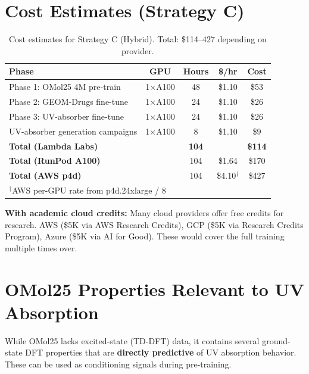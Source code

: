 \documentclass[11pt,a4paper]{article}
\begin{document}
\section{Cost Estimates (Strategy C)}

\begin{table}[h]
\centering
\begin{tabular}{@{}lcccc@{}}
\toprule
\textbf{Phase} & \textbf{GPU} & \textbf{Hours} & \textbf{\$/hr} & \textbf{Cost} \\
\midrule
Phase 1: OMol25 4M pre-train & 1$\times$A100 & 48 & \$1.10 & \$53 \\
Phase 2: GEOM-Drugs fine-tune & 1$\times$A100 & 24 & \$1.10 & \$26 \\
Phase 3: UV-absorber fine-tune & 1$\times$A100 & 24 & \$1.10 & \$26 \\
UV-absorber generation campaigns & 1$\times$A100 & 8 & \$1.10 & \$9 \\
\midrule
\textbf{Total (Lambda Labs)} & & \textbf{104} & & \textbf{\$114} \\
\midrule
\textbf{Total (RunPod A100)} & & 104 & \$1.64 & \$170 \\
\textbf{Total (AWS p4d)} & & 104 & \$4.10$^\dagger$ & \$427 \\
\bottomrule
\multicolumn{5}{l}{\small $^\dagger$AWS per-GPU rate from p4d.24xlarge / 8} \\
\end{tabular}
\caption{Cost estimates for Strategy C (Hybrid). Total: \$114--427 depending on provider.}
\end{table}

\textbf{With academic cloud credits:} Many cloud providers offer free credits
for research. AWS (\$5K via AWS Research Credits), GCP (\$5K via Research
Credits Program), Azure (\$5K via AI for Good). These would cover the full
training multiple times over.

\section{OMol25 Properties Relevant to UV Absorption}
\label{sec:omol25-uv-properties}

While OMol25 lacks excited-state (TD-DFT) data, it contains several
ground-state DFT properties that are \textbf{directly predictive} of
UV absorption behavior. These can be used as conditioning signals during
pre-training.
\end{document}
